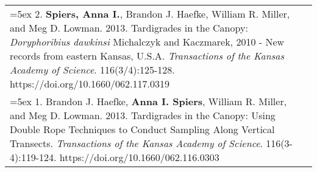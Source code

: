 \begin{longtable}{@{} >{\raggedright}p{6.10in} >{\raggedleft}X @{}}
\hangindent=5ex 2. \textbf{Spiers, Anna I.}, Brandon J. Haefke, William R. Miller, and Meg D. Lowman. 2013. Tardigrades in the Canopy: \emph{Doryphoribius dawkinsi} Michalczyk and Kaczmarek, 2010 - New records from eastern Kansas, U.S.A. \emph{Transactions of the Kansas Academy of Science}. 116(3/4):125-128. https://doi.org/10.1660/062.117.0319  &  \tabularnewline

\hangindent=5ex 1. Brandon J. Haefke, \textbf{Anna I. Spiers}, William R. Miller, and Meg D. Lowman. 2013. Tardigrades in the Canopy: Using Double Rope Techniques to Conduct Sampling Along Vertical Transects. \emph{Transactions of the Kansas Academy of Science}. 116(3-4):119-124. https://doi.org/10.1660/062.116.0303  &  \tabularnewline

\end{longtable}

